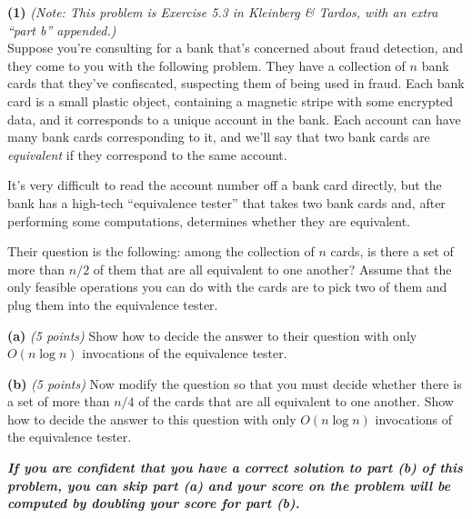 \documentclass[11pt]{article}
\def\gap{0.1in}
\def\bigap{0.25in}
\begin{document}
\setlength{\parindent}{0in}
\addtolength{\parskip}{0.1cm}
\setlength{\fboxrule}{.5mm}\setlength{\fboxsep}{1.2mm}
\newlength{\boxlength}\setlength{\boxlength}{\textwidth}
\addtolength{\boxlength}{-4mm}
\begin{center}
\end{center}
\vspace{5mm}

{\bf (1)} {\em (Note: This problem is Exercise 5.3 in Kleinberg \& Tardos,
with an extra ``part b'' appended.)}\\
Suppose you're consulting for a bank that's concerned about 
fraud detection, and they come to you with the following
problem. They have a collection of $n$ bank cards that they've
confiscated, suspecting them of being used in fraud. Each bank 
card is a small plastic object, containing a magnetic stripe
with some encrypted data, and it corresponds to a unique 
account in the bank. Each account can have many bank cards
corresponding to it, and we'll say that two bank cards are
{\em equivalent} if they correspond to the same account.

It's very difficult to read the account number off a bank card
directly, but the bank has a high-tech ``equivalence tester'' that
takes two bank cards and, after performing some computations,
determines whether they are equivalent.

Their question is the following: among the collection of 
$n$ cards, is there a set of more than $n/2$ of them that are
all equivalent to one another? Assume that the only feasible 
operations you can do with the cards are to pick two of them
and plug them into the equivalence tester. 

\vskip \gap
{\bf (a)} {\em (5 points)}
Show how to decide the answer to their question with 
only $O(n \log n)$ invocations of the equivalence tester.

\vskip \gap
{\bf (b)} {\em (5 points)}
Now modify the question so that you must decide whether there
is a set of more than $n/4$ of the cards that are all equivalent
to one another. Show how to decide the answer to this question
with only $O(n \log n)$ invocations of the equivalence
tester. 

{\bf \itshape{If you are confident that you have a correct solution to
part (b) of this problem, you can skip part (a) and 
your score on the problem will be computed by doubling
your score for part (b).}}


\vskip \bigap

\end{document}
